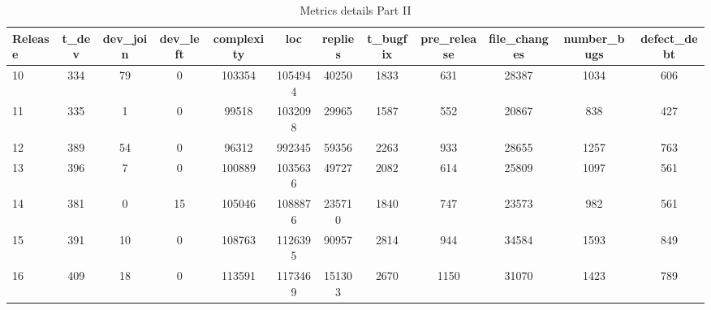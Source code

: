 \begin{table*}[!hbt]
      \begin{center}
            \caption{Metrics details Part II}
            \label{tab:metrics_details_2}
            \begin{tabular}{l| c c c c c c c c c c c }
            \toprule
            \textbf{Release}  & \textbf{t\_dev} & \textbf{dev\_join} & \textbf{dev\_left} & \textbf{complexity} & \textbf{loc} & \textbf{replies}  & \textbf{t\_bugfix}  & \textbf{pre\_release} & \textbf{file\_changes} & \textbf{number\_bugs} &  \textbf{defect\_debt} \\ \midrule  
                  10 &   334 &       79 &        0 &     103354 & 1054944 &            40250 &     1833 &                                631 &        28387 &        1034 &         606   \\                                                                     
                  11 &   335 &        1 &        0 &      99518 & 1032098 &            29965 &     1587 &                                552 &        20867 &         838 &         427   \\                                                                     
                  12 &   389 &       54 &        0 &      96312 &  992345 &            59356 &     2263 &                                933 &        28655 &        1257 &         763   \\                                                                     
                  13 &   396 &        7 &        0 &     100889 & 1035636 &            49727 &     2082 &                                614 &        25809 &        1097 &         561   \\                                                                     
                  14 &   381 &        0 &       15 &     105046 & 1088876 &           235710 &     1840 &                                747 &        23573 &         982 &         561   \\                                                                     
                  15 &   391 &       10 &        0 &     108763 & 1126395 &            90957 &     2814 &                                944 &        34584 &        1593 &         849   \\                                                                     
                  16 &   409 &       18 &        0 &     113591 & 1173469 &           151303 &     2670 &                               1150 &        31070 &        1423 &         789   \\                                                                     

\end{tabular}
\end{center}
\end{table*}
